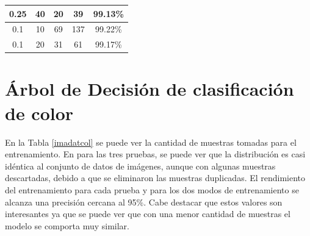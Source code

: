\documentclass[twoside,spanish,ESP,MSc]{plantillaLabUPV}
\theoremstyle{definition}
\begin{document}
\begin{table}[!tbh]
\begin{tabular}{|c|c|c|c|c|}
		0.25                                                                      & 40                                                                              & 20                                                                 & 39                                                                  & 99.13\%              \\ \hline
		0.1                                                                       & 10                                                                              & 69                                                                 & 137                                                                 & 99.22\%              \\ \hline
		0.1                                                                       & 20                                                                              & 31                                                                 & 61                                                                  & 99.17\%              \\ \hline
	\end{tabular}
\end{table}




\section{Árbol de Decisión de clasificación de color}

En la Tabla \ref{imadatcol} se puede ver la cantidad de muestras tomadas para el entrenamiento. En para las tres pruebas, se puede ver que la distribución es casi idéntica al conjunto de datos de imágenes, aunque con algunas muestras descartadas, debido a que se eliminaron las muestras duplicadas. El rendimiento del entrenamiento para cada prueba y para los dos modos de entrenamiento se alcanza una precisión cercana al 95\%. Cabe destacar que estos valores son interesantes ya que se puede ver que con una menor cantidad de muestras el modelo se comporta muy similar.
\end{document}

